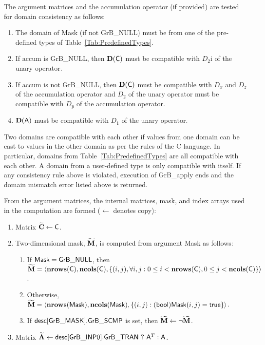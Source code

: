 The argument matrices and the accumulation 
operator (if provided) are tested for domain consistency as follows:
\begin{enumerate}
	\item The domain of {\sf Mask} (if not {\sf GrB\_NULL}) must be from one of 
    the pre-defined types of Table~\ref{Tab:PredefinedTypes}.

	\item If {\sf accum} is {\sf GrB\_NULL}, then $\bold{D}({\sf C})$ must be 
    compatible with $D_2$i of the unary operator.

	\item If {\sf accum} is not {\sf GrB\_NULL}, then $\bold{D}({\sf C})$ must be
    compatible with $D_x$ and $D_z$ of the accumulation operator and 
    $D_2$ of the unary operator must be compatible with $D_y$ of the accumulation operator.

	\item $\bold{D}({\sf A})$ must be compatible with $D_1$ of the unary operator.
\end{enumerate}
Two domains are compatible with each other if values from one domain can be cast 
to values in the other domain as per the rules of the C language.
In particular, domains from Table~\ref{Tab:PredefinedTypes} are all compatible 
with each other. A domain from a user-defined type is only compatible with itself.
If any consistency rule above is violated, execution of {\sf GrB\_apply} ends
and the domain mismatch error listed above is returned.

From the argument matrices, the internal matrices, mask, and index arrays used in 
the computation are formed ($\leftarrow$ denotes copy):
\begin{enumerate}
	\item Matrix ${\bf \widetilde{C}} \leftarrow {\sf C}$.

	\item Two-dimensional mask, ${\bf \widetilde{M}}$, is computed from 
    argument {\sf Mask} as follows:
	\begin{enumerate}

		\item	If ${\sf Mask} = {\sf GrB\_NULL}$, then ${\bf \widetilde{M}} = 
        \langle \bold{nrows}({\sf C}), \bold{ncols}({\sf C}), \{(i,j), 
        \forall i,j : 0 \leq i <  \bold{nrows}({\sf C}), 0 \leq j < 
        \bold{ncols}({\sf C}) \} \rangle$.

		\item	Otherwise, ${\bf \widetilde{M}} = \langle 
        \bold{nrows}({\sf Mask}), \bold{ncols}({\sf Mask}), \{(i,j) : 
        ({\sf bool}){\sf Mask}(i,j) = {\sf true}\} \rangle$.

		\item	If ${\sf desc[GrB\_MASK].GrB\_SCMP}$ is set, then 
        ${\bf \widetilde{M}} \leftarrow \neg {\bf \widetilde{M}}$.

	\end{enumerate}

	\item Matrix ${\bf \widetilde{A}} \leftarrow 
    {\sf desc[GrB\_INP0].GrB\_TRAN} \ ? \ {\sf A}^T : {\sf A}$.
    
\end{enumerate}

